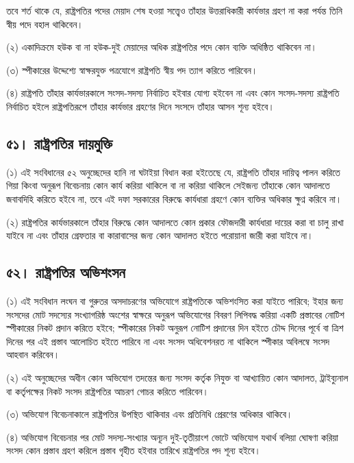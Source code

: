 \documentclass[11pt]{article}
\begin{document}
তবে শর্ত থাকে যে, রাষ্ট্রপতির পদের মেয়াদ শেষ হওয়া সত্ত্বেও তাঁহার
উত্তরাধিকারী কার্যভার গ্রহণ না করা পর্যন্ত তিনি স্বীয় পদে বহাল থাকিবেন।

(২) একাদিক্রমে হউক বা না হউক-দুই মেয়াদের অধিক রাষ্ট্রপতির পদে কোন ব্যক্তি
    অধিষ্ঠিত থাকিবেন না।

(৩) স্পীকারের উদ্দেশ্যে স্বাক্ষরযুক্ত পত্রযোগে রাষ্ট্রপতি স্বীয় পদ ত্যাগ করিতে
    পারিবেন।

(৪) রাষ্ট্রপতি তাঁহার কার্যভারকালে সংসদ-সদস্য নির্বাচিত হইবার যোগ্য হইবেন না
    এবং কোন সংসদ-সদস্য রাষ্ট্রপতি নির্বাচিত হইলে রাষ্ট্রপতিরূপে তাঁহার কার্যভার
    গ্রহণের দিনে সংসদে তাঁহার আসন শূন্য হইবে।
\subsection{৫১। রাষ্ট্রপতির দায়মুক্তি}
\label{sec:org88e1e96}

(১) এই সংবিধানের ৫২ অনুচ্ছেদের হানি না ঘটাইয়া বিধান করা হইতেছে যে,
    রাষ্ট্রপতি তাঁহার দায়িত্ব পালন করিতে গিয়া কিংবা অনুরূপ বিবেচনায় কোন কার্য
    করিয়া থাকিলে বা না করিয়া থাকিলে সেইজন্য তাঁহাকে কোন আদালতে জবাবদিহি
    করিতে হইবে না, তবে এই দফা সরকারের বিরুদ্ধে কার্যধারা গ্রহণে কোন ব্যক্তির
    অধিকার ক্ষুণ্ন করিবে না।

(২) রাষ্ট্রপতির কার্যভারকালে তাঁহার বিরুদ্ধে কোন আদালতে কোন প্রকার ফৌজদারী
    কার্যধারা দায়ের করা বা চালু রাখা যাইবে না এবং তাঁহার গ্রেফতার বা কারাবাসের
    জন্য কোন আদালত হইতে পরোয়ানা জারী করা যাইবে না।

\subsection{৫২। রাষ্ট্রপতির অভিশংসন}
\label{sec:orgde8f83a}
(১) এই সংবিধান লংঘন বা গুরুতর অসদাচরণের অভিযোগে রাষ্ট্রপতিকে অভিশংসিত করা
    যাইতে পারিবে; ইহার জন্য সংসদের মোট সদস্যের সংখ্যাগরিষ্ঠ অংশের স্বাক্ষরে
    অনুরূপ অভিযোগের বিবরণ লিপিবদ্ধ করিয়া একটি প্রস্তাবের নোটিশ স্পীকারের নিকট
    প্রদান করিতে হইবে; স্পীকারের নিকট অনুরূপ নোটিশ প্রদানের দিন হইতে চৌদ্দ
    দিনের পূর্বে বা ত্রিশ দিনের পর এই প্রস্তাব আলোচিত হইতে পারিবে না এবং সংসদ
    অধিবেশনরত না থাকিলে স্পীকার অবিলম্বে সংসদ আহবান করিবেন।

(২) এই অনুচ্ছেদের অধীন কোন অভিযোগ তদন্তের জন্য সংসদ কর্তৃক নিযুক্ত বা আখ্যায়িত
    কোন আদালত, ট্রাইব্যুনাল বা কর্তৃপক্ষের নিকট সংসদ রাষ্ট্রপতির আচরণ গোচর করিতে
    পারিবেন।

(৩) অভিযোগ বিবেচনাকালে রাষ্ট্রপতির উপস্থিত থাকিবার এবং প্রতিনিধি প্রেরণের
    অধিকার থাকিবে।

(৪) অভিযোগ বিবেচনার পর মোট সদস্য-সংখ্যার অন্যূন দুই-তৃতীয়াংশ ভোটে অভিযোগ
    যথার্থ বলিয়া ঘোষণা করিয়া সংসদ কোন প্রস্তাব গ্রহণ করিলে প্রস্তাব গৃহীত হইবার
    তারিখে রাষ্ট্রপতির পদ শূন্য হইবে।
\end{document}
